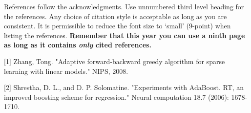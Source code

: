 \documentclass{article} %
\begin{document}
References follow the acknowledgments. Use unnumbered third level heading for
the references. Any choice of citation style is acceptable as long as you are
consistent. It is permissible to reduce the font size to `small' (9-point)
when listing the references. {\bf Remember that this year you can use
a ninth page as long as it contains \emph{only} cited references.}

\small{
[1] Zhang, Tong. "Adaptive forward-backward greedy algorithm for sparse learning with linear models." NIPS, 2008.

[2] Shrestha, D. L., and D. P. Solomatine. "Experiments with AdaBoost. RT, an improved boosting scheme for regression." Neural computation 18.7 (2006): 1678-1710.
}
\end{document}
